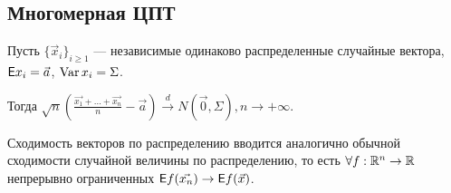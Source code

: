 \subsection{Многомерная ЦПТ}
    \begin{theorem}
    	Пусть $\{\vec x_i\}_{i \geqslant 1}$ --- независимые одинаково распределенные случайные вектора, $\mathsf{E} x_i = \vec{a}$, $\operatorname{Var} x_i = \Sigma$.
    	
    	Тогда $\sqrt{n} \left(\frac{\vec{x_1} + \ldots + \vec{x_n}}{n} - \vec{a} \right) \xrightarrow{d} N(\vec{0}, \Sigma), n \rightarrow +\infty$.
    \end{theorem}
    
\begin{note}
	Сходимость векторов по распределению вводится аналогично обычной сходимости случайной величины по распределению, то есть $\forall f: \mathbb{R}^n \rightarrow \mathbb{R}$ непрерывно ограниченных $\mathsf{E} f(\vec{x_n}) \rightarrow \mathsf{E} f(\vec{x})$.
\end{note}